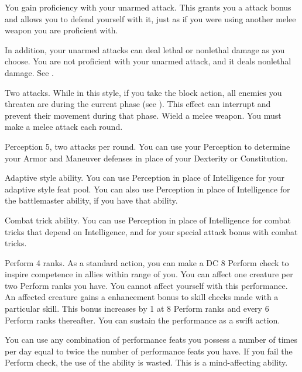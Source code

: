 \featben You gain proficiency with your unarmed attack.
This grants you a  attack bonus and allows you to defend yourself with it, just as if you were using another melee weapon you are proficient with.

In addition, your unarmed attacks can deal lethal or nonlethal damage as you choose.
 You are not proficient with your unarmed attack, and it deals nonlethal damage. See .

\featpre Two attacks.
\featben While in this style, if you take the block action, all enemies you threaten are \immobilized during the current phase (see ).
This effect can interrupt and prevent their movement during that phase.
\stylereq Wield a melee weapon.
You must make a melee attack each round.

\featpres Perception 5, two attacks per round.
\featben You can use your Perception to determine your Armor and Maneuver defenses in place of your Dexterity or Constitution.

\featpre Adaptive style ability.
\featben You can use Perception in place of Intelligence for your adaptive style feat pool.
You can also use Perception in place of Intelligence for the battlemaster ability, if you have that ability.

\featpre Combat trick ability.
\featben You can use Perception in place of Intelligence for combat tricks that depend on Intelligence, and for your special attack bonus with combat tricks.

\featpre Perform 4 ranks.
\featben As a standard action, you can make a DC 8 Perform check to inspire competence in allies within \rngmed range of you.
You can affect one creature per two Perform ranks you have.
You cannot affect yourself with this performance.
An affected creature gains a  enhancement bonus to skill checks made with a particular skill.
This bonus increases by 1 at 8 Perform ranks and every 6 Perform ranks thereafter.
You can sustain the performance as a swift action.

You can use any combination of performance feats you possess a number of times per day equal to twice the number of performance feats you have.
If you fail the Perform check, the use of the ability is wasted.
This is a mind-affecting ability.

